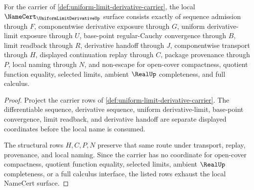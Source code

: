 \begin{theorem}
\label{thm:uniform-limit-derivative-namecert-obligations}
For the carrier of \autoref{def:uniform-limit-derivative-carrier}, the local $\NameCert_{\UniformLimitDerivativeUp}$ surface consists exactly of sequence admission through $F$, componentwise derivative exposure through $G$, uniform derivative-limit exposure through $U$, base-point regular-Cauchy convergence through $B$, limit readback through $R$, derivative handoff through $J$, componentwise transport through $H$, displayed continuation replay through $C$, package provenance through $P$, local naming through $N$, and non-escape for open-cover compactness, quotient function equality, selected limits, ambient $\RealUp$ completeness, and full calculus.
\end{theorem}
\begin{proof}
Project the carrier rows of \autoref{def:uniform-limit-derivative-carrier}. The differentiable sequence, derivative sequence, uniform derivative-limit, base-point convergence, limit readback, and derivative handoff are separate displayed coordinates before the local name is consumed.

The structural rows $H,C,P,N$ preserve that same route under transport, replay, provenance, and local naming. Since the carrier has no coordinate for open-cover compactness, quotient function equality, selected limits, ambient $\RealUp$ completeness, or a full calculus interface, the listed rows exhaust the local NameCert surface.
\end{proof}

